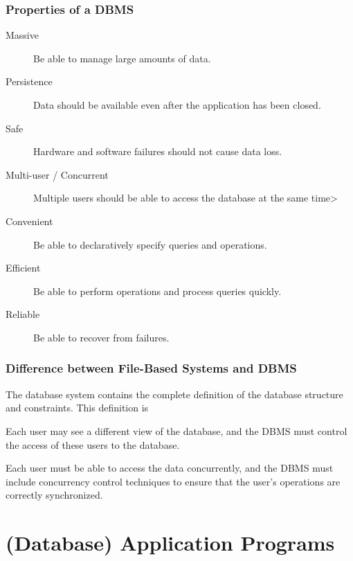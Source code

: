 \documentclass[12pt letter]{report}
\begin{document}
\subsubsection{Properties of a DBMS}

\begin{description}
  \item[Massive] Be able to manage large amounts of data.
  \item[Persistence]  Data should be available even after the application has been closed.
  \item[Safe]  Hardware and software failures should not cause data loss.
  \item[Multi-user / Concurrent] Multiple users should be able to access the database at the same time>
  \item[Convenient] Be able to declaratively specify queries and operations.
  \item[Efficient] Be able to perform operations and process queries quickly.
  \item[Reliable] Be able to recover from failures.
\end{description}

\subsubsection{Difference between File-Based Systems and DBMS}


The database system contains the complete definition of the database structure and constraints. This definition is


Each user may see a different view of the database, and the DBMS must control the access of these users to the database.


Each user must be able to access the data concurrently, and the DBMS must include concurrency control techniques to ensure that the user's operations are correctly synchronized.



\section{(Database) Application Programs}
\end{document}
